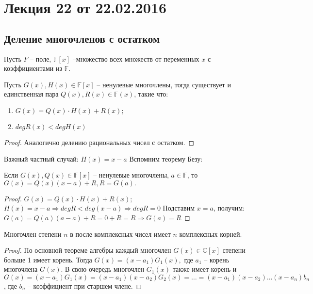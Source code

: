 


\renewcommand{\phi}{\varphi}

\section{Лекция 22 от 22.02.2016}

\subsection*{Деление многочленов с остатком}

Пусть $F$ -- поле, $\mathbb{F}[x]$ --множество всех множеств от переменных $x$ с коэффициентами из $\mathbb{F}$.
\begin{Theorem}
	Пусть $G(x), H(x) \in \mathbb{F}[x]$ -- ненулевые многочлены, тогда существует и единственная пара $Q(x), R(x) \in \mathbb{F}(x)$, такие что:
	\begin{enumerate}
		\item $G(x) = Q(x)\cdot H(x) + R(x);$
		\item $degR(x) < degH(x)$
	\end{enumerate}
\end{Theorem}
\begin{proof}
Аналогично делению рациональных чисел с остатком.
\end{proof}
Важный частный случай: $H(x) = x - a$
Вспомним теорему Безу:
\begin{Theorem}
	Если $G(x), Q(x) \in \mathbb{F}[x]$ -- ненулевые многочлены, $a \in \mathbb{F}$, то $G(x) = Q(x)(x - a) + R, R = G(a).$
\end{Theorem}
\begin{proof}
	$G(x) = Q(x)\cdot H(x) + R(x);$
	$H(x) = x - a \Rightarrow degR < deg(x - a) \Rightarrow degR = 0$
	Подставим $x = a$, получим:
	$G(a) = Q(a)(a-a) + R = 0 + R = R \Rightarrow G(a) = R$
\end{proof}
\begin{Theorem}
	Многочлен степени $n$ в после комплексных чисел имеет $n$ комплексных корней.
\end{Theorem}
\begin{proof}
	По основной теореме алгебры каждый многочлен $G(x) \in \mathbb{C}[x]$ степени больше 1 имеет корень. Тогда $G(x) = (x - a_1)G_1(x),$ где $a_1$ -- корень многочлена $G(x)$. В свою очередь многочлен $G_1(x)$ также имеет корень и $G(x) = (x - a_1)G_1(x) = (x - a_1)(x - a_2)G_2(x) = \ldots = (x - a_1)(x - a_2)\ldots(x - a_n)b_n$, где $b_n$ -- коэффициент при старшем члене.
\end{proof}
